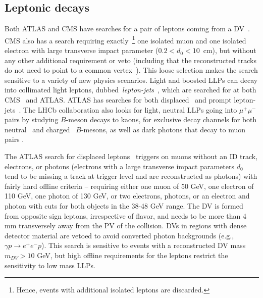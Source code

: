 \subsection{Leptonic decays}
\label{subsec:dleptons}

Both ATLAS and CMS have searches for a pair of leptons coming from a DV~\cite{Aad:2015rba,CMS:2014hka,CMS:2015pca}. CMS also has a search requiring exactly~\footnote{Hence, events with additional isolated leptons are discarded.} one isolated muon and one isolated electron with large transverse impact parameter ($0.2 < d_{0} < 10$~cm), but without any other additional requirement or veto (including that the reconstructed tracks do not need to point to a common vertex~\cite{CMS-PAS-EXO-16-022}). This loose selection makes the search sensitive to a variety of new physics scenarios. Light and boosted LLPs can decay into collimated light leptons, dubbed~\emph{lepton-jets}~\cite{ArkaniHamed:2008qp}, which are searched for at both CMS~\cite{Khachatryan:2015wka} and ATLAS.  ATLAS has searches for both displaced~\cite{Aad:2014yea,ATLAS-CONF-2016-042} and prompt lepton-jets~\cite{Aad:2015sms}.  The LHCb collaboration also looks for light, neutral LLPs going into $\mu^+ \mu^-$ pairs by studying $B$-meson decays to kaons, for exclusive decay channels for both neutral~\cite{Aaij:2015tna} and charged~\cite{Aaij:2016qsm} $B$-mesons, as well as dark photons that decay to muon pairs \cite{Aaij:2017rft}.

The ATLAS search for displaced leptons~\cite{Aad:2015rba} triggers on muons without an ID track, electrons, or photons (electrons with a large transverse impact parameters $d_0$ tend to be missing a track at trigger level and are reconstructed as photons) with fairly hard offline \pT criteria -- requiring either one muon of 50 GeV, one electron of 110 GeV, one photon of 130 GeV, or two electrons, photons, or an electron and photon with \pT cuts for both objects in the 38-48 GeV range.  The DV is formed from opposite sign leptons, irrespective of flavor, and needs to be more than 4 mm transversely away from the PV of the collision.  DVs in regions with dense detector material are vetoed to avoid converted photon backgrounds (e.g., $\gamma p\to e^+ e^-p$).  This search is sensitive to events with a reconstructed DV mass $m_{DV}>10$ GeV, but high offline \pT requirements for the leptons restrict the sensitivity to low mass LLPs.

